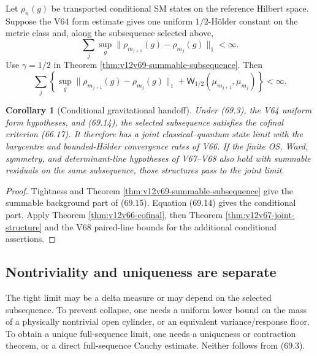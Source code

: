 \documentclass[11pt]{article}
\newtheorem{corollary}[theorem]{Corollary}
\theoremstyle{remark}
\begin{document}
Let \(\rho_n(g)\) be transported conditional SM states on the
reference Hilbert space.  Suppose the V64 form estimate gives one
uniform \(1/2\)-Hölder constant on the metric class and, along the
subsequence selected above,
\begin{equation}
 \sum_j
 \sup_g\|\rho_{m_{j+1}}(g)-\rho_{m_j}(g)\|_1
 <\infty.                                         \tag{69.14}
\end{equation}
Use \(\gamma=1/2\) in Theorem
\ref{thm:v12v69-summable-subsequence}.  Then
\begin{equation}
 \sum_j
 \left\{
 \sup_g\|\rho_{m_{j+1}}(g)-\rho_{m_j}(g)\|_1
 +
 {\mathsf W}_{1/2}(\mu_{m_{j+1}},\mu_{m_j})
 \right\}<\infty.                                 \tag{69.15}
\end{equation}

\begin{corollary}[Conditional gravitational handoff]
\label{cor:v12v69-joint}
Under (69.3), the V64 uniform form hypotheses, and (69.14), the
selected subsequence satisfies the cofinal criterion (66.17).
It therefore has a joint classical--quantum state limit with the
barycentre and bounded-Hölder convergence rates of V66.  If the
finite OS, Ward, symmetry, and determinant-line hypotheses of
V67--V68 also hold with summable residuals on the same subsequence,
those structures pass to the joint limit.
\end{corollary}

\begin{proof}
Tightness and Theorem
\ref{thm:v12v69-summable-subsequence} give the summable background
part of (69.15).  Equation (69.14) gives the conditional part.
Apply Theorem \ref{thm:v12v66-cofinal}, then Theorem
\ref{thm:v12v67-joint-structure} and the V68 paired-line bounds for
the additional conditional assertions.
\end{proof}

\subsection{Nontriviality and uniqueness are separate}

The tight limit may be a delta measure or may depend on the selected
subsequence.  To prevent collapse, one needs a uniform lower bound
on the mass of a physically nontrivial open cylinder, or an
equivalent variance/response floor.  To obtain a unique full-sequence
limit, one needs a uniqueness or contraction theorem, or a direct
full-sequence Cauchy estimate.  Neither follows from (69.3).
\end{document}
